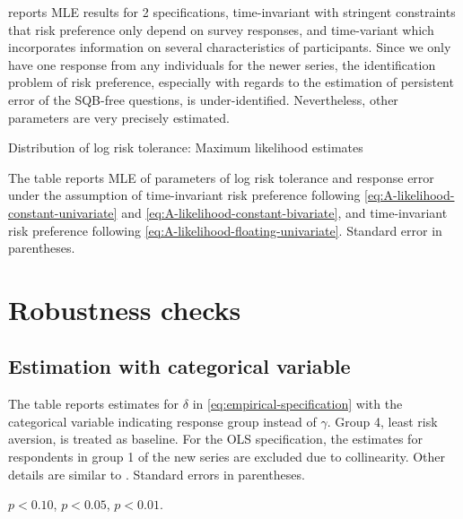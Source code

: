 \documentclass[emulatestandardclasses, 10pt, abstract = true]{scrartcl}
\begin{document}
 reports MLE results for 2 specifications, time-invariant with stringent constraints that risk preference only depend on survey responses, and time-variant which incorporates information on several characteristics of participants. Since we only have one response from any individuals for the newer series, the identification problem of risk preference, especially with regards to the estimation of persistent error of the SQB-free questions, is under-identified. Nevertheless, other parameters are very precisely estimated.
\parskip 0cm
\begin{table}[!htbp]
	\centering \setlength{\extrarowheight}{0.3em}
	\caption{Distribution of log risk tolerance: Maximum likelihood estimates}
	\begin{threeparttable}
		
		\begin{tablenotes}[flushleft]\footnotesize
			\item The table reports MLE of parameters of log risk tolerance and response error under the assumption of time-invariant risk preference following \eqref{eq:A-likelihood-constant-univariate} and \eqref{eq:A-likelihood-constant-bivariate}, and time-invariant risk preference following \eqref{eq:A-likelihood-floating-univariate}. Standard error in parentheses.
		\end{tablenotes}
	\end{threeparttable}
	\label{table:appendix-mle}
\end{table}


\parskip 0cm

\pagebreak



\section{Robustness checks}
\subsection{Estimation with categorical variable}

\begin{ThreePartTable}
	\begin{TableNotes}[flushleft]\footnotesize
		\item \footnotesize The table reports estimates for $\delta$ in \eqref{eq:empirical-specification} with the categorical variable indicating response group instead of $\gamma$. Group 4, least risk aversion, is treated as baseline. For the OLS specification, the estimates for respondents in group 1 of the new series are excluded due to collinearity. Other details are similar to . Standard errors in parentheses.
		\item \sym{*} \(p<0.10\), \sym{**} \(p<0.05\), \sym{***} \(p<0.01\).\\
	\end{TableNotes}
	
\end{ThreePartTable}
\end{document}

